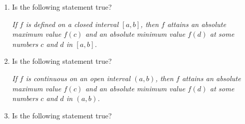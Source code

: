\documentclass[../main.tex]{subfiles}
\begin{document}
\begin{enumerate}
  \item Is the following statement true? 

    \begin{minipage}{.4\textwidth}
    \end{minipage}
    \begin{minipage}{.55\textwidth}
      \vspace{-2.5cm}
      \textit{If \(f\) is defined on a \emph{closed} interval \([a,b]\), then \(f\) attains an absolute maximum value \(f(c)\) \emph{and} an absolute minimum value \(f(d)\) at some numbers \(c\) and \(d\) in \([a,b]\).}
    \end{minipage}

    \vfill

  \item Is the following statement true? 

    \begin{minipage}{.4\textwidth}
    \end{minipage}
    \begin{minipage}{.55\textwidth}
      \vspace{-2cm}
      \textit{If \(f\) is continuous on an open interval \((a,b)\), then \(f\) attains an absolute maximum value \(f(c)\) \emph{and} an absolute minimum value \(f(d)\) at some numbers \(c\) and \(d\) in \((a,b)\).}
    \end{minipage}

    \vfill

  \item Is the following statement true? 



\end{enumerate}
\end{document}
